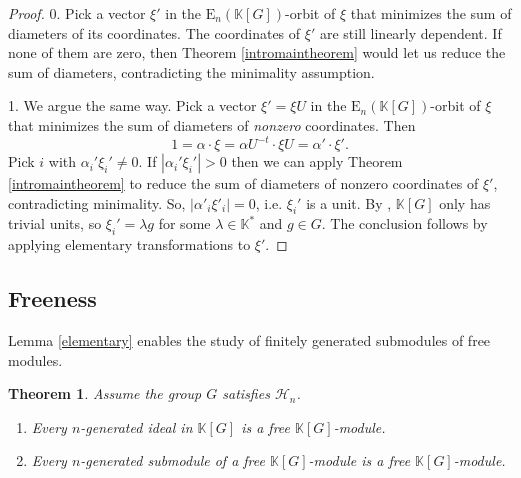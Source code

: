 \documentclass[11pt,letterpaper]{amsart}
\newtheorem{theorem}{Theorem}
\newtheorem*{remark}{Remark}
\begin{document}
\begin{proof}
0. Pick a vector $\xi'$ in the $\mathrm{E}_n(\mathbb K[G])$-orbit of $\xi$ that minimizes the sum of diameters of its coordinates. The coordinates of $\xi'$ are still linearly dependent. If none of them are zero, then Theorem \ref{intromaintheorem} would let us reduce the sum of diameters, contradicting the minimality assumption.

1. We argue the same way. Pick a vector $\xi'=\xi U$ in the $\mathrm{E}_n(\mathbb K[G])$-orbit of $\xi$ that minimizes the sum of diameters of {\it nonzero} coordinates. Then 
$$
1=\alpha\cdot\xi=\alpha U^{-t}\cdot \xi U=\alpha'\cdot\xi'.
$$ 
Pick $i$ with $\alpha_i'\xi_i'\not=0$. If $|\alpha_i'\xi_i'|>0$ then we can apply Theorem \ref{intromaintheorem} to reduce the sum of diameters of nonzero coordinates of $\xi'$, contradicting minimality. So, $|\alpha'_i\xi'_i|=0$, i.e. $\xi_i'$ is a unit. By \cite{delzant}, $\mathbb K[G]$ only has trivial units, so $\xi_i'=\lambda g$  for some $\lambda\in\mathbb K^*$ and $g\in G$. The conclusion follows by applying elementary transformations to $\xi'$. 
\end{proof}
  
\subsection{Freeness}
Lemma \ref{elementary} enables the study of finitely generated submodules of free modules.

\begin{theorem}
\label{freemodules}
Assume the group $G$ satisfies ${\mathcal{H}_{n}}$.
\begin{enumerate}
\item[1.] 
Every $n$-generated ideal in $\mathbb{K} [G]$ is a free $\mathbb{K}[G]$-module.
\item[2.] 
Every $n$-generated submodule of a free $\mathbb{K} [G]$-module is a free $\mathbb{K} [G]$-module.
\end{enumerate}
\end{theorem}
\end{document}

